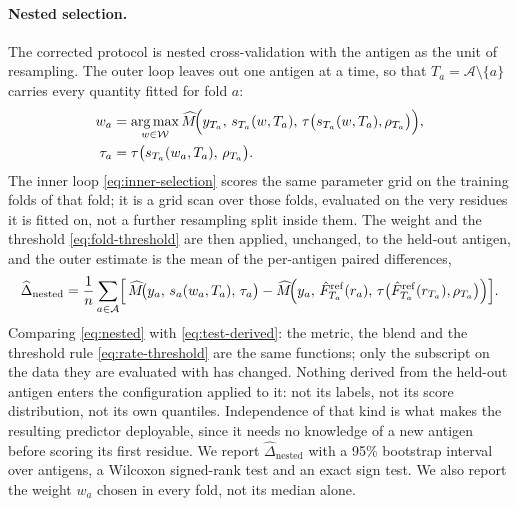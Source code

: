 \paragraph{Nested selection.} The corrected protocol is nested
cross-validation with the antigen as the unit of resampling. The outer loop
leaves out one antigen at a time, so that \(T_a=\mathcal{A}\setminus\{a\}\)
carries every quantity fitted for fold \(a\):
\begin{align}
w_a &= \operatorname*{arg\,max}_{w\in\mathcal{W}}
 \widehat{M}\!\Bigl(y_{T_a},\,s_{T_a}(w,T_a),\,
 \tau\bigl(s_{T_a}(w,T_a),\rho_{T_a}\bigr)\Bigr), \label{eq:inner-selection}\\
\tau_a &= \tau\bigl(s_{T_a}(w_a,T_a),\,\rho_{T_a}\bigr). \label{eq:fold-threshold}
\end{align}
The inner loop \eqref{eq:inner-selection} scores the same parameter grid on the
training folds of that fold; it is a grid scan over those folds, evaluated on
the very residues it is fitted on, not a further resampling split inside them.
The weight and the threshold \eqref{eq:fold-threshold} are then applied,
unchanged, to the held-out antigen, and the outer estimate is the mean of the
per-antigen paired differences,
\begin{equation}
\label{eq:nested}
\widehat{\Delta}_{\mathrm{nested}}
=\frac{1}{n}\sum_{a\in\mathcal{A}}
\Bigl[\,
\widehat{M}\!\bigl(y_a,\,s_a(w_a,T_a),\,\tau_a\bigr)
-\widehat{M}\!\Bigl(y_a,\,\hat{F}^{\mathrm{ref}}_{T_a}(r_a),\,
\tau\bigl(\hat{F}^{\mathrm{ref}}_{T_a}(r_{T_a}),\rho_{T_a}\bigr)\Bigr)
\Bigr].
\end{equation}
Comparing \eqref{eq:nested} with \eqref{eq:test-derived}: the metric, the
blend and the threshold rule \eqref{eq:rate-threshold} are the same functions; only the subscript on the
data they are evaluated with has changed. Nothing derived from the
held-out antigen enters the configuration applied to it: not its labels, not its
score distribution, not its own quantiles. Independence of that kind is what makes the
resulting predictor deployable, since it needs no knowledge of a new antigen
before scoring its first residue. We report
\(\widehat{\Delta}_{\mathrm{nested}}\) with a 95\% bootstrap interval over
antigens, a Wilcoxon signed-rank test and an exact sign test. We also report
the weight \(w_a\) chosen in every fold, not its median alone.

